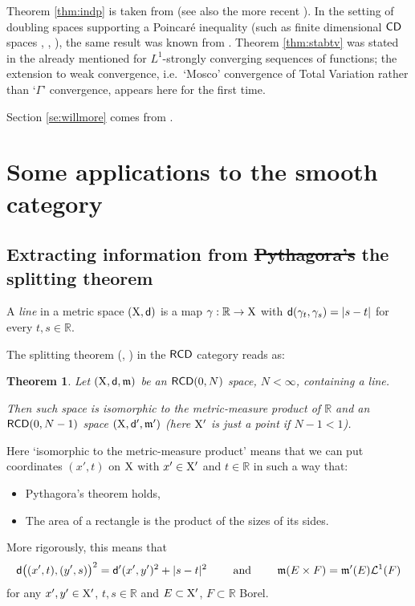 \documentclass[11pt]{article}
\numberwithin{equation}{section}
\newtheorem{theorem}{Theorem}[section]
\newcommand{\R}{\mathbb{R}}
\newcommand{\X}{{\rm X}}
\newcommand{\sfd}{{\sf d}}
\newcommand{\mm}{{\mathfrak m}}
\newcommand{\CD}{{\sf CD}}
\newcommand{\RCD}{{\sf RCD}}
\DeclareRobustCommand{\hsout}[1]{\texorpdfstring{\sout{#1}}{#1}}
\begin{document}
{Theorem \ref{thm:indp} is taken from \cite{GigliHan14} (see also the more recent \cite{GiNo21}). In the setting of doubling spaces supporting a Poincar\'e inequality (such as finite dimensional $\CD$ spaces \cite{Lott-Villani07}, \cite{Sturm06II}, \cite{Rajala12}), the same result was known from \cite[Lemma 5.1]{KKST12}. Theorem \ref{thm:stabtv} was stated in the already mentioned \cite{AH16} for $L^1$-strongly converging sequences of functions; the extension to weak convergence, i.e.\ `Mosco' convergence of Total Variation rather than `$\Gamma$' convergence, appears here for the first time.




Section \ref{se:willmore} comes from \cite{GV23}.
}



\section{Some  applications to the smooth category}
\subsection{Extracting information from  \hsout{Pythagora's} the  splitting theorem}\label{se:pitagora}
A \emph{line} in a metric space $(\X,\sfd)$ is a map  $\gamma:\R\to\X$ with $\sfd(\gamma_t,\gamma_s)=|s-t|$ for every $t,s\in\R$.

The splitting theorem (\cite{Gigli13}, \cite{Gigli13over}) in the $\RCD$ category reads as:
\begin{theorem}\label{thm:splittingrcd}
Let $(\X,\sfd,\mm)$ be an $\RCD(0,N)$ space, $N<\infty$, containing a line.

Then such space is isomorphic to the metric-measure product of $\R$ and an $\RCD(0,N-1)$ space $(\X,\sfd',\mm')$ (here $\X'$ is just a point if $N-1<1$).
\end{theorem}
Here `isomorphic to the metric-measure product' means that we can put coordinates $(x',t)$ on $\X$ with $x'\in\X'$ and $t\in\R$ in such a way that:
\begin{itemize}
\item[a)] Pythagora's theorem holds,
\item[b)] The area of a rectangle is the product of the sizes of its sides.
\end{itemize}
More rigorously, this means that
\[
\begin{split}
\sfd\big((x',t),(y',s)\big)^2=\sfd'(x',y')^2+|s-t|^2\qquad\text{ and }\qquad \mm(E\times F)=\mm'(E)\mathcal L^1(F)
\end{split}
\]
for any $x',y'\in\X'$, $t,s\in\R$ and $E\subset\X'$, $F\subset\R$ Borel.
\end{document}
